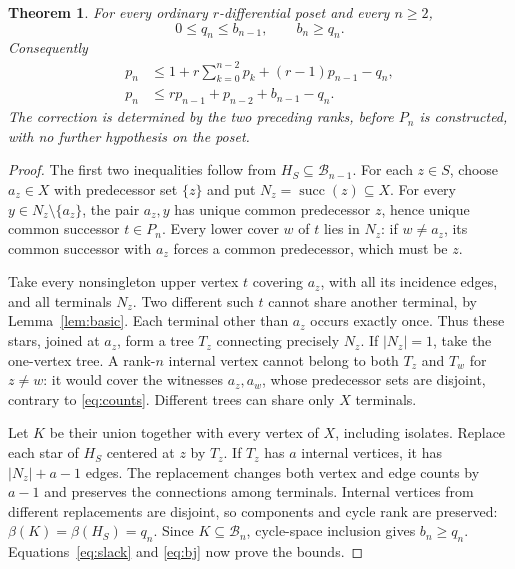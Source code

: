 \documentclass[11pt]{article}
\newtheorem{theorem}{Theorem}[section]
\theoremstyle{remark}
\newcommand{\B}{\mathcal B}
\newcommand{\succs}{\operatorname{succ}}
\begin{document}
\begin{theorem}\label{thm:main}
For every ordinary $r$-differential poset and every $n\ge2$,
\begin{equation}\label{eq:transfer}
 0\le q_n\le b_{n-1},\qquad b_n\ge q_n.
\end{equation}
Consequently
\begin{align}
 p_n&\le1+r\sum_{k=0}^{n-2}p_k+(r-1)p_{n-1}-q_n,\label{eq:refined}\\
 p_n&\le r p_{n-1}+p_{n-2}+b_{n-1}-q_n.\label{eq:residual}
\end{align}
The correction is determined by the two preceding ranks, before $P_n$ is
constructed, with no further hypothesis on the poset.
\end{theorem}
\begin{proof}
The first two inequalities follow from $H_S\subseteq\B_{n-1}$.
For each $z\in S$, choose $a_z\in X$ with predecessor set $\{z\}$ and put
$N_z=\succs(z)\subseteq X$. For every $y\in N_z\setminus\{a_z\}$,
the pair $a_z,y$ has unique common predecessor $z$, hence unique common
successor $t\in P_n$. Every lower cover $w$ of $t$ lies in $N_z$:
if $w\ne a_z$, its common successor with $a_z$ forces a common predecessor,
which must be $z$.

Take every nonsingleton upper vertex $t$ covering $a_z$, with all its
incidence edges, and all terminals $N_z$. Two different such $t$ cannot
share another terminal, by Lemma~\ref{lem:basic}. Each terminal other than
$a_z$ occurs exactly once. Thus these stars, joined at $a_z$, form a tree
$T_z$ connecting precisely $N_z$. If $|N_z|=1$, take the one-vertex tree.
A rank-$n$ internal vertex cannot belong to both $T_z$ and $T_w$ for $z\ne w$:
it would cover the witnesses $a_z,a_w$, whose predecessor sets are disjoint,
contrary to \eqref{eq:counts}. Different trees can share only $X$ terminals.

Let $K$ be their union together with every vertex of $X$, including isolates.
Replace each star of $H_S$ centered at $z$ by $T_z$.
If $T_z$ has $a$ internal vertices, it has $|N_z|+a-1$ edges.
The replacement changes both vertex and edge counts by $a-1$ and preserves
the connections among terminals. Internal vertices from different
replacements are disjoint, so components and cycle rank are preserved:
$\beta(K)=\beta(H_S)=q_n$. Since $K\subseteq\B_n$, cycle-space inclusion gives
$b_n\ge q_n$. Equations~\eqref{eq:slack} and \eqref{eq:bj} now prove the bounds.
\end{proof}
\end{document}
